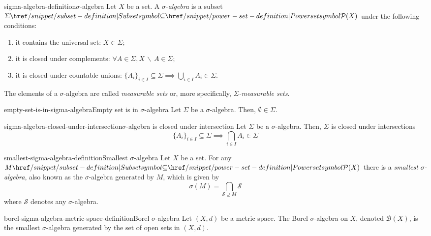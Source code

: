 \documentclass[preview]{standalone}
\begin{document}
\genpage

\begin{snippetdefinition}{sigma-algebra-definition}{\(\sigma\)-algebra}
    Let \(X\) be a set.
    A \(\sigma\)-\textit{algebra} is a subset \(\Sigma \subseteq \powerset(X)\)
    under the following conditions:
    \begin{enumerate}
        \item it contains the universal set: \(X \in \Sigma\);
        \item it is closed under complements: \(\forall A \in \Sigma, X \,\backslash\, A \in \Sigma\);
        \item it is closed under countable unions: \({\{A_i\}}_{i \in I} \subseteq \Sigma \implies \bigcup_{i \in I} A_i \in \Sigma \).
    \end{enumerate}
    The elements of a \(\sigma\)-algebra are called \textit{measurable sets}
    or, more specifically, \textit{\(\Sigma\)-measurable sets}.
\end{snippetdefinition}

\begin{snippetcorollary}{empty-set-is-in-sigma-algebra}{Empty set is in \(\sigma\)-algebra}
    Let \(\Sigma\) be a \(\sigma\)-algebra. Then, \(\emptyset \in \Sigma\).
\end{snippetcorollary}

\begin{snippetcorollary}{sigma-algebra-closed-under-intersection}{\(\sigma\)-algebra is closed under intersection}
    Let \(\Sigma\) be a \(\sigma\)-algebra. Then, \(\Sigma\) is closed under intersections
    \[
        {\{A_i\}}_{i \in I} \subseteq \Sigma \implies \bigcap_{i \in I} A_i \in \Sigma
    \]
\end{snippetcorollary}

\begin{snippetdefinition}{smallest-sigma-algebra-definition}{Smallest \(\sigma\)-algebra}
    Let \(X\) be a set. For any \(M \subseteq \powerset(X)\)
    there is a \textit{smallest \(\sigma\)-algebra}, also known as the
    \(\sigma\)-algebra generated by \(M\), which is given by
    \[ \sigma(M) = \bigcap_{\mathcal{S} \supseteq M} \mathcal{S} \]
    where \(\mathcal{S}\) denotes any \(\sigma\)-algebra.
\end{snippetdefinition}

\begin{snippetdefinition}{borel-sigma-algebra-metric-space-definition}{Borel \(\sigma\)-algebra}
    Let \((X, d)\) be a metric space.
    The Borel \(\sigma\)-algebra on \(X\), denoted \(\mathcal{B}(X)\),
    is the smallest \(\sigma\)-algebra generated by the set of open sets in \((X, d)\).
\end{snippetdefinition}

\end{document}
